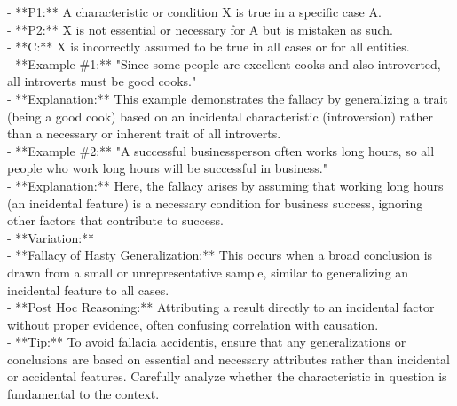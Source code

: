 \documentclass[a4paper,12pt,single,pdftex]{scrbook}
\begin{document}
    
        - **P1:** A characteristic or condition X is true in a specific case A.
    \\

    
        - **P2:** X is not essential or necessary for A but is mistaken as such.
    \\

    
        - **C:** X is incorrectly assumed to be true in all cases or for all entities.
    \\

    
      - **Example \#1:** "Since some people are excellent cooks and also introverted, all introverts must be good cooks."
    \\

    
      - **Explanation:** This example demonstrates the fallacy by generalizing a trait (being a good cook) based on an incidental characteristic (introversion) rather than a necessary or inherent trait of all introverts.
    \\

    
      - **Example \#2:** "A successful businessperson often works long hours, so all people who work long hours will be successful in business."
    \\

    
      - **Explanation:** Here, the fallacy arises by assuming that working long hours (an incidental feature) is a necessary condition for business success, ignoring other factors that contribute to success.
    \\

    
      - **Variation:**
    \\

    
        - **Fallacy of Hasty Generalization:** This occurs when a broad conclusion is drawn from a small or unrepresentative sample, similar to generalizing an incidental feature to all cases.
    \\

    
        - **Post Hoc Reasoning:** Attributing a result directly to an incidental factor without proper evidence, often confusing correlation with causation.
    \\

    
      - **Tip:** To avoid fallacia accidentis, ensure that any generalizations or conclusions are based on essential and necessary attributes rather than incidental or accidental features. Carefully analyze whether the characteristic in question is fundamental to the context.
    \\
\end{document}
